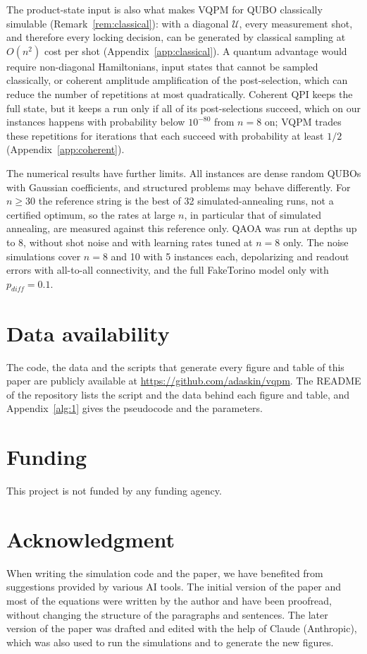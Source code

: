 \documentclass[onecolumn,10pt]{article}
\theoremstyle{remark}
\theoremstyle{plain}
\begin{document}
The product-state input is also what makes VQPM for QUBO classically simulable (Remark~\ref{rem:classical}): with a diagonal $\mathcal{U}$, every measurement shot, and therefore every locking decision, can be generated by classical sampling at $O(n^2)$ cost per shot (Appendix~\ref{app:classical}). A quantum advantage would require non-diagonal Hamiltonians, input states that cannot be sampled classically, or coherent amplitude amplification of the post-selection, which can reduce the number of repetitions at most quadratically. Coherent QPI keeps the full state, but it keeps a run only if all of its post-selections succeed, which on our instances happens with probability below $10^{-80}$ from $n=8$ on; VQPM trades these repetitions for iterations that each succeed with probability at least $1/2$ (Appendix~\ref{app:coherent}).

The numerical results have further limits. All instances are dense random QUBOs with Gaussian coefficients, and structured problems may behave differently. For $n\ge30$ the reference string is the best of 32 simulated-annealing runs, not a certified optimum, so the rates at large $n$, in particular that of simulated annealing, are measured against this reference only. QAOA was run at depths up to 8, without shot noise and with learning rates tuned at $n=8$ only. The noise simulations cover $n=8$ and 10 with 5 instances each, depolarizing and readout errors with all-to-all connectivity, and the full FakeTorino model only with $p_{diff}=0.1$.

\section*{Data availability}
The code, the data and the scripts that generate every figure and table of this paper are publicly available at \url{https://github.com/adaskin/vqpm}. The README of the repository lists the script and the data behind each figure and table, and Appendix~\ref{alg:1} gives the pseudocode and the parameters.

\section*{Funding}
This project is not funded by any funding agency. 

\section*{Acknowledgment}
When writing the simulation code and the paper, we have benefited from suggestions provided by various AI tools. The initial version of the paper and most of the equations were written by the author and have been proofread, without changing the structure of the paragraphs and sentences. The later version of the paper was drafted and edited with the help of Claude (Anthropic), which was also used to run the simulations and to generate the new figures.
\end{document}
